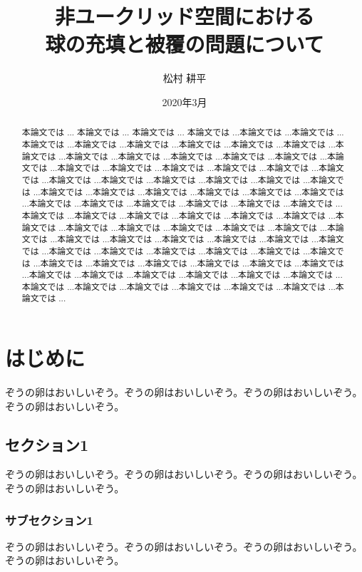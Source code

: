 \documentclass[12pt, xelatex,ja=standard,jafont=noto]{bxjsreport}
\date{2020年3月} %
\affiliation{立命館大学}
\title{非ユークリッド空間における\\球の充填と被覆の問題について}
\author{松村 耕平}
\begin{document}
\maketitle

\begin{abstract}
本論文では ...
本論文では ...
本論文では ...
本論文では ...本論文では ...本論文では ...本論文では ...本論文では ...本論文では ...本論文では ...本論文では ...本論文では ...本論文では ...本論文では ...本論文では ...本論文では ...本論文では ...本論文では ...本論文では ...本論文では ...本論文では ...本論文では ...本論文では ...本論文では ...本論文では ...本論文では ...本論文では ...本論文では ...本論文では ...本論文では ...本論文では ...本論文では ...本論文では ...本論文では ...本論文では ...本論文では ...本論文では ...本論文では ...本論文では ...本論文では ...本論文では ...本論文では ...本論文では ...本論文では ...本論文では ...本論文では ...本論文では ...本論文では ...本論文では ...本論文では ...本論文では ...本論文では ...本論文では ...本論文では ...本論文では ...本論文では ...本論文では ...本論文では ...本論文では ...本論文では ...本論文では ...本論文では ...本論文では ...本論文では ...本論文では ...本論文では ...本論文では ...本論文では ...本論文では ...本論文では ...本論文では ...本論文では ...本論文では ...本論文では ...本論文では ...本論文では ...本論文では ...本論文では ...本論文では ...本論文では ...本論文では ...本論文では ...本論文では ...本論文では ...本論文では ...本論文では ...本論文では ...
\end{abstract}


\tableofcontents


\chapter{はじめに}
ぞうの卵はおいしいぞう。ぞうの卵はおいしいぞう。ぞうの卵はおいしいぞう。ぞうの卵はおいしいぞう。
\section{セクション1}
ぞうの卵はおいしいぞう。ぞうの卵はおいしいぞう。ぞうの卵はおいしいぞう。ぞうの卵はおいしいぞう。
\subsection{サブセクション1}
ぞうの卵はおいしいぞう。ぞうの卵はおいしいぞう。ぞうの卵はおいしいぞう。ぞうの卵はおいしいぞう。
\end{document}
